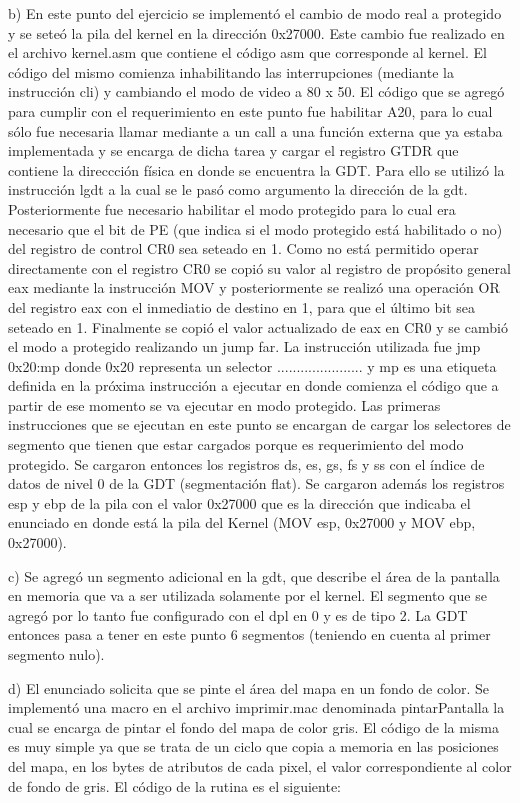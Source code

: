 \documentclass[a4paper]{article}
\begin{document}
b) En este punto del ejercicio se implementó el cambio de modo real a protegido y se seteó la pila del kernel en la dirección 0x27000. Este cambio fue realizado en el archivo kernel.asm que contiene el código asm que corresponde al kernel. El código del mismo comienza inhabilitando las interrupciones (mediante la instrucción cli) y cambiando el modo de video a 80 x 50. El código que se agregó para cumplir con el requerimiento en este punto fue habilitar A20, para lo cual sólo fue necesaria llamar mediante a un call a una función externa que ya estaba implementada y se encarga de dicha tarea y cargar el registro GTDR que contiene la direccción física en donde se encuentra la GDT. Para ello se utilizó la instrucción lgdt a la cual se le pasó como argumento la dirección de la gdt. Posteriormente fue necesario habilitar el modo protegido para lo cual era necesario que el bit de PE (que indica si el modo protegido está habilitado o no) del registro de control CR0 sea seteado en 1. Como no está permitido operar directamente con el registro CR0 se copió su valor al registro de propósito general eax mediante la instrucción MOV y posteriormente se realizó una operación OR del registro eax con el inmediatio de destino en 1, para que el último bit sea seteado en 1. Finalmente se copió el valor actualizado de eax en CR0 y se cambió el modo a protegido realizando un jump far. La instrucción utilizada fue jmp 0x20:mp donde 0x20 representa un selector ...................... y mp es una etiqueta definida en la próxima instrucción a ejecutar en donde comienza el código que a partir de ese momento se va ejecutar en modo protegido. Las primeras instrucciones que se ejecutan en este punto se encargan de cargar los selectores de segmento que tienen que estar cargados porque es requerimiento del modo protegido. Se cargaron entonces los registros ds, es, gs, fs y ss con el índice de datos de nivel 0 de la GDT (segmentación flat). Se cargaron además los registros esp y ebp de la pila con el valor 0x27000 que es la dirección que indicaba el enunciado en donde está la pila del Kernel (MOV esp, 0x27000 y MOV ebp, 0x27000).

c) Se agregó un segmento adicional en la gdt, que describe el área de la pantalla en memoria que va a ser utilizada solamente por el kernel. El segmento que se agregó por lo tanto fue configurado con el dpl en 0 y es de tipo 2. La GDT entonces pasa a tener en este punto 6 segmentos (teniendo en cuenta al primer segmento nulo).

d) El enunciado solicita que se pinte el área del mapa en un fondo de color. Se implementó una macro en el archivo imprimir.mac denominada pintarPantalla la cual se encarga de pintar el fondo del mapa de color gris. El código de la misma es muy simple ya que se trata de un ciclo que copia a memoria en las posiciones del mapa, en los bytes de atributos de cada pixel, el valor correspondiente al color de fondo de gris. El código de la rutina es el siguiente: 
\end{document}
